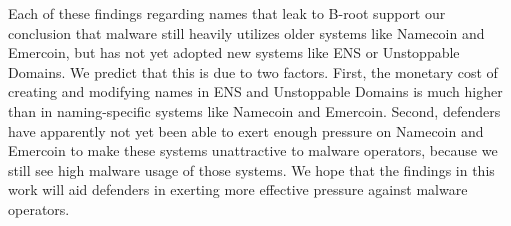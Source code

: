 Each of these findings regarding names that leak to B-root support our 
conclusion that malware still heavily utilizes older systems like Namecoin and 
Emercoin, but has not yet adopted new systems like ENS or 
Unstoppable Domains. We predict that this is due to two 
factors. First, the monetary cost of creating and modifying 
names in ENS and Unstoppable Domains is much higher than in 
naming-specific systems like Namecoin and Emercoin. Second, 
defenders have apparently not yet been able to exert enough 
pressure on Namecoin and Emercoin to make these systems 
unattractive to malware operators, because we still see high 
malware usage of those systems. We hope that the findings in 
this work will aid defenders in exerting more effective 
pressure against malware operators.
